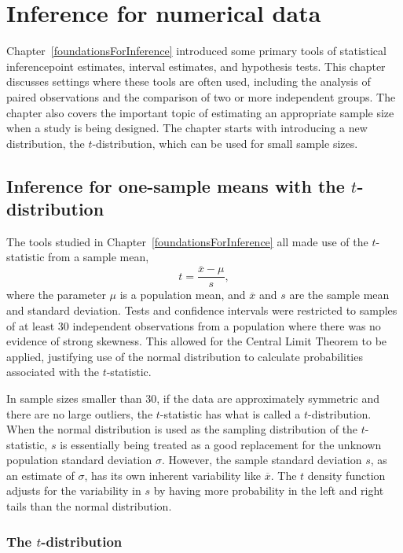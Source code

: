 
\chapter{Inference for numerical data}
\label{inferenceForNumericalData}


Chapter~\ref{foundationsForInference} introduced some primary tools of statistical inference\textemdash point estimates, interval estimates, and hypothesis tests. This chapter discusses settings where these tools are often used, including the analysis of paired observations and the comparison of two or more independent groups. The chapter also covers the important topic of estimating an appropriate sample size when a study is being designed.  The chapter starts with introducing a new distribution, the $t$-distribution, which can be used for small sample sizes. 


\section{Inference for one-sample means with the $t$-distribution}
\label{oneSampleMeansWithTDistribution}

The tools studied in Chapter~\ref{foundationsForInference} all made use of the $t$-statistic from a sample mean,
\[t = \frac{\overline{x} - \mu}{s},\]
where the parameter $\mu$ is a population mean, and $\overline{x}$ and $s$ are the sample mean and standard deviation. Tests and confidence intervals were restricted to samples of at least 30 independent observations from a population where there was no evidence of strong skewness. This allowed for the Central Limit Theorem to be applied, justifying use of the normal distribution to calculate probabilities associated with the $t$-statistic. 

In sample sizes smaller than 30, if the data are approximately symmetric and there are no large outliers, the $t$-statistic has what is called a $t$-distribution. When the normal distribution is used as the sampling distribution of the $t$-statistic, $s$ is essentially being treated as a good replacement for the unknown population standard deviation $\sigma$. However, the sample standard deviation $s$, as an estimate of $\sigma$, has its own inherent variability like $\overline{x}$. The $t$ density function adjusts for the variability in $s$ by having more probability in the left and right tails than the normal distribution.

\subsection{The $t$-distribution}
\label{introducingTheTDistribution}

